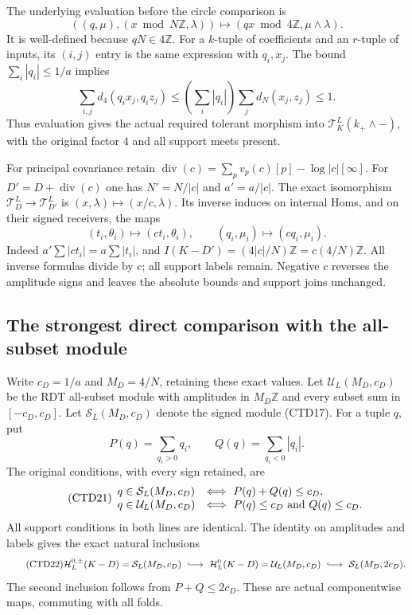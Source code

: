 The underlying evaluation before the circle comparison is
\begin{equation}\tag{CTD19}
((q,\mu),(x\bmod N\mathbb Z,\lambda))
\longmapsto(qx\bmod4\mathbb Z,\mu\wedge\lambda).
\end{equation}
It is well-defined because $qN\in4\mathbb Z$.
For a $k$-tuple of coefficients and an $r$-tuple of inputs,
its $(i,j)$ entry is the same expression with $q_i,x_j$.
The bound $\sum_i|q_i|\le1/a$ implies
\[
\sum_{i,j}d_4(q_ix_j,q_iz_j)
\le\left(\sum_i|q_i|\right)\sum_jd_N(x_j,z_j)\le1.
\]
Thus evaluation gives the actual required tolerant morphism into
$\mathcal T_K^L(k_+\wedge-)$, with the original factor $4$
and all support meets present.

For principal covariance retain
$\operatorname{div}(c)=\sum_pv_p(c)[p]-\log|c|[\infty]$.
For $D'=D+\operatorname{div}(c)$ one has
$N'=N/|c|$ and $a'=a/|c|$. The exact isomorphism
$\mathcal T_D^L\to\mathcal T_{D'}^L$ is
$(x,\lambda)\mapsto(x/c,\lambda)$.
Its inverse induces on internal Homs, and on their signed
receivers, the maps
\begin{equation}\tag{CTD20}
(t_i,\theta_i)\longmapsto(ct_i,\theta_i),\qquad
(q_i,\mu_i)\longmapsto(cq_i,\mu_i).
\end{equation}
Indeed $a'\sum|ct_i|=a\sum|t_i|$, and
$I(K-D')=(4|c|/N)\mathbb Z=c(4/N)\mathbb Z$.
All inverse formulas divide by $c$; all support labels remain.
Negative $c$ reverses the amplitude signs and leaves the absolute
bounds and support joins unchanged.

\subsection{The strongest direct comparison with the all-subset module}

Write $c_D=1/a$ and $M_D=4/N$, retaining these exact values.
Let $\mathcal U_L(M_D,c_D)$ be the RDT all-subset module with
amplitudes in $M_D\mathbb Z$ and every subset sum in
$[-c_D,c_D]$. Let $\mathcal S_L(M_D,c_D)$ denote the signed
module (CTD17). For a tuple $q$, put
\[
P(q)=\sum_{q_i>0}q_i,\qquad
Q(q)=\sum_{q_i<0}|q_i|.
\]
The original conditions, with every sign retained, are
\begin{equation}\tag{CTD21}
\begin{array}{ll}
q\in\mathcal S_L(M_D,c_D)&\Longleftrightarrow\
P(q)+Q(q)\le c_D,\\
q\in\mathcal U_L(M_D,c_D)&\Longleftrightarrow\
P(q)\le c_D\ \hbox{and}\ Q(q)\le c_D.
\end{array}
\end{equation}
All support conditions in both lines are identical. The identity
on amplitudes and labels gives the exact natural inclusions
\begin{equation}\tag{CTD22}
\mathcal H^{0,\pm}_L(K-D)
=\mathcal S_L(M_D,c_D)
\ \lhook\joinrel\longrightarrow\
\mathcal H^0_L(K-D)=\mathcal U_L(M_D,c_D)
\ \lhook\joinrel\longrightarrow\
\mathcal S_L(M_D,2c_D).
\end{equation}
The second inclusion follows from $P+Q\le2c_D$.
These are actual componentwise maps, commuting with all folds.

